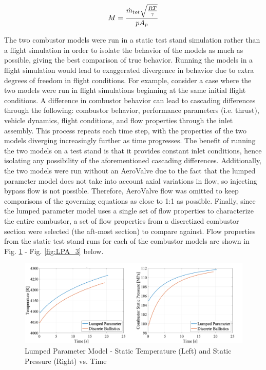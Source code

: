 \begin{equation}
\centering   
M=\frac{\dot{m}_{tot}\sqrt{\frac{RT}{\gamma}}}{pA_p}
\end{equation}

The two combustor models were run in a static test stand simulation rather than a flight simulation in order to isolate the behavior of the models as much as possible, giving the best comparison of true behavior. Running the models in a flight simulation would lead to exaggerated divergence in behavior due to extra degrees of freedom in flight conditions. For example, consider a case where the two models were run in flight simulations beginning at the same initial flight conditions. A difference in combustor behavior can lead to cascading differences through the following: combustor behavior, performance parameters (i.e. thrust), vehicle dynamics, flight conditions, and flow properties through the inlet assembly. This process repeats each time step, with the properties of the two models diverging increasingly further as time progresses. The benefit of running the two models on a test stand is that it provides constant inlet conditions, hence isolating any possibility of the aforementioned cascading differences. Additionally, the two models were run without an AeroValve due to the fact that the lumped parameter model does not take into account axial variations in flow, so injecting bypass flow is not possible. Therefore, AeroValve flow was omitted to keep comparisons of the governing equations as close to 1:1 as possible. Finally, since the lumped parameter model uses a single set of flow properties to characterize the entire combustor, a set of flow properties from a discretized combustor section were selected (the aft-most section) to compare against. Flow properties from the static test stand runs for each of the combustor models are shown in Fig. \ref{fig:LPA_1} - Fig. \ref{fig:LPA_3} below.

\begin{figure}[H]
\centering
\includegraphics[width=1\textwidth] {Combustor_Figures/LPA_1.png}
\caption{Lumped Parameter Model - Static Temperature (Left) and Static Pressure (Right) vs. Time}
\label{fig:LPA_1}
\end{figure}

